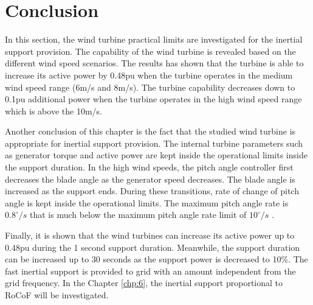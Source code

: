 \section{Conclusion}
In this section, the wind turbine practical limits are investigated for the inertial support provision. The capability of the wind turbine is revealed based on the different wind speed scenarios. The results has shown that the turbine is able to increase its active power by 0.48pu when the turbine operates in the medium wind speed range (6m/s and 8m/s). The turbine capability decreases down to 0.1pu additional power when the turbine operates in the high wind speed range which is above the 10m/s.\par
Another conclusion of this chapter is the fact that the studied wind turbine is appropriate for inertial support provision. The internal turbine parameters such as generator torque and active power are kept inside the operational limits inside the support duration. In the high wind speeds, the pitch angle controller first decreases the blade angle as the generator speed decreases. The blade angle is increased as the support ends. During these transitions, rate of change of pitch angle is kept inside the operational limits. The maximum pitch angle rate is $0.8^{\circ}/s$ that is much below the maximum pitch angle rate limit of $10^{\circ}/s$ \cite{Ackermann2005a}.\par
Finally, it is shown that the wind turbines can increase its active power up to 0.48pu during the 1 second support duration. Meanwhile, the support duration can be increased up to 30 seconds as the support power is decreased to 10\%. The fast inertial support is provided to grid with an amount independent from the grid frequency. In the Chapter \ref{chp:6}, the inertial support proportional to RoCoF will be investigated. 